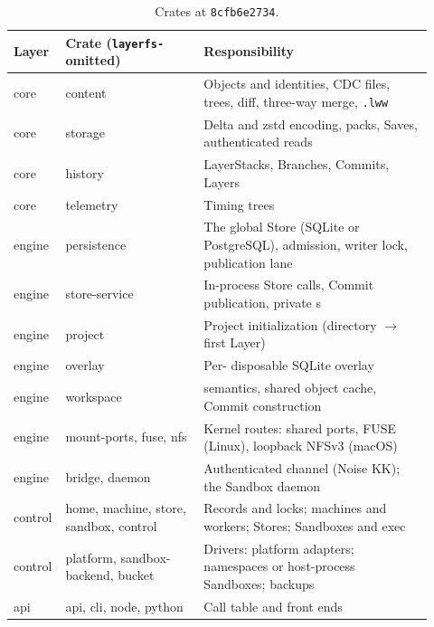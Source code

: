 \begin{table}[h]
\centering
\small
\begin{tabular}{p{0.07\linewidth} p{0.32\linewidth} p{0.53\linewidth}}
\toprule
Layer & Crate (\texttt{layerfs-} omitted) & Responsibility \\
\midrule
core & content & Objects and identities, CDC files, trees, diff, three-way merge, \texttt{.lww} \\
core & storage & Delta and zstd encoding, packs, Saves, authenticated reads \\
core & history & LayerStacks, Branches, Commits, Layers \\
core & telemetry & Timing trees \\
engine & persistence & The global Store (SQLite or PostgreSQL), admission, writer lock, publication lane \\
engine & store-service & In-process Store calls, Commit publication, private \ws{}s \\
engine & project & Project initialization (directory $\rightarrow$ first Layer) \\
engine & overlay & Per-\ws{} disposable SQLite overlay \\
engine & workspace & \ws{} semantics, shared object cache, Commit construction \\
engine & mount-ports, fuse, nfs & Kernel routes: shared ports, FUSE (Linux), loopback NFSv3 (macOS) \\
engine & bridge, daemon & Authenticated channel (Noise KK); the Sandbox daemon \\
control & home, machine, store, sandbox, control & Records and locks; machines and workers; Stores; Sandboxes and exec \\
control & platform, sandbox-backend, bucket & Drivers: platform adapters; namespaces or host-process Sandboxes; backups \\
api & api, cli, node, python & Call table and front ends \\
\bottomrule
\end{tabular}
\caption{Crates at \texttt{8cfb6e2734}.}
\label{tab:crates}
\end{table}

